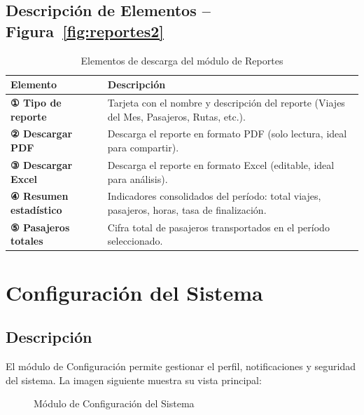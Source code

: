 \documentclass[12pt,a4paper]{report}
\begin{document}
\section{Descripción de Elementos -- Figura~\ref{fig:reportes2}}

\begin{table}[H]
  \centering
  \renewcommand{\arraystretch}{1.4}
  \begin{tabularx}{\textwidth}{@{}L{5cm} X@{}}
    \toprule
    \textbf{Elemento} & \textbf{Descripción} \\
    \midrule
    \textbf{① Tipo de reporte} & Tarjeta con el nombre y descripción del reporte (Viajes del Mes, Pasajeros, Rutas, etc.). \\
    \textbf{② Descargar PDF} & Descarga el reporte en formato PDF (solo lectura, ideal para compartir). \\
    \textbf{③ Descargar Excel} & Descarga el reporte en formato Excel (editable, ideal para análisis). \\
    \textbf{④ Resumen estadístico} & Indicadores consolidados del período: total viajes, pasajeros, horas, tasa de finalización. \\
    \textbf{⑤ Pasajeros totales} & Cifra total de pasajeros transportados en el período seleccionado. \\
    \bottomrule
  \end{tabularx}
  \caption{Elementos de descarga del módulo de Reportes}
\end{table}

\chapter{Configuración del Sistema}

\section{Descripción}

El módulo de Configuración permite gestionar el perfil, notificaciones y seguridad del sistema. La imagen siguiente muestra su vista principal:

\begin{figure}[H]
  \centering
  \fbox{\rule{0pt}{4cm}\hspace{10cm}}
  \caption{Módulo de Configuración del Sistema}
  \label{fig:config}
\end{figure}
\end{document}
